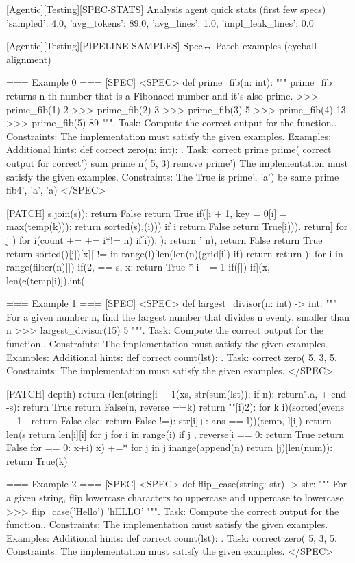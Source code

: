 [Agentic][Testing][SPEC-STATS] Analysis agent quick stats (first few specs)
{'sampled': 4.0, 'avg_tokens': 89.0, 'avg_lines': 1.0, 'impl_leak_lines': 0.0}

[Agentic][Testing][PIPELINE-SAMPLES] Spec↔ Patch examples (eyeball alignment)

=== Example 0 ===
[SPEC]
<SPEC> def prime_fib(n: int): """ prime_fib returns n-th number that is a Fibonacci number and it's also prime. >>> prime_fib(1) 2 >>> prime_fib(2) 3 >>> prime_fib(3) 5 >>> prime_fib(4) 13 >>> prime_fib(5) 89 """. Task: Compute the correct output for the function.. Constraints: The implementation must satisfy the given examples. Examples: Additional hints: def correct zero(n: int): . Task: correct prime prime( correct output for correct') sum prime n( 5, 3) remove prime') The implementation must satisfy the given examples. Constraints: The True is prime', 'a') be same prime fib4', 'a', 'a) </SPEC>

[PATCH]
s.join(s)): return False return True if([i + 1, key = 0[i] = max(temp(k))): return sorted(s),(i))) if i  return False return True[i))). return] for j ) for i(count += += i*!= n) if[i)): ): return ' n), return False return True return sorted()[j])[x][ != in range(l)[len(len(n)(grid[i]) if) return return ): for i in range(filter(n)]]) if(2, == s, x: return True * i += 1 if([]) if](x, len(e(temp[i)]),int(

=== Example 1 ===
[SPEC]
<SPEC> def largest_divisor(n: int) -> int: """ For a given number n, find the largest number that divides n evenly, smaller than n >>> largest_divisor(15) 5 """. Task: Compute the correct output for the function.. Constraints: The implementation must satisfy the given examples. Examples: Additional hints: def correct count(lst): . Task: correct zero( 5, 3, 5. Constraints: The implementation must satisfy the given examples. </SPEC>

[PATCH]
depth) return (len(string[i + 1(xs, str(sum(lst)): if n): return".a, + end -s): return True return False(n, reverse ==k) return ""[i)2): for k i)(sorted(evens + 1 - return False else: return False !=): str[i]+: ans == l))(temp, l[i]) return len(s return len[i][i] for j for i in range(i) if j , reverse[i == 0: return True return False for == 0: x+i) x) +=* for j in j inange(append(n) return [j)[len(num)): return True(k)

=== Example 2 ===
[SPEC]
<SPEC> def flip_case(string: str) -> str: """ For a given string, flip lowercase characters to uppercase and uppercase to lowercase. >>> flip_case('Hello') 'hELLO' """. Task: Compute the correct output for the function.. Constraints: The implementation must satisfy the given examples. Examples: Additional hints: def correct count(lst): . Task: correct zero( 5, 3, 5. Constraints: The implementation must satisfy the given examples. </SPEC>


